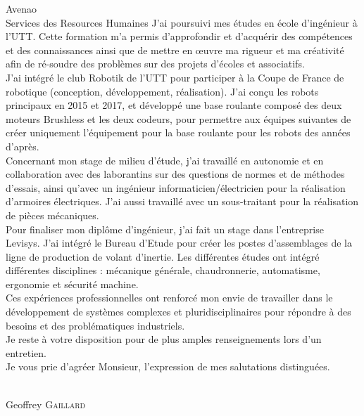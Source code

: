 \documentclass[a4paper,10pt,firstfoot=false]{scrlttr2}
\begin{document}
\begin{letter}{Avenao \\ Services des Resources Humaines}
J’ai poursuivi mes études en école d’ingénieur à l’UTT. Cette formation m’a permis d’approfondir et d’acquérir des compétences et des connaissances ainsi que de mettre en œuvre ma rigueur et ma créativité afin de ré-soudre des problèmes sur des projets d’écoles et associatifs.\\

J'ai intégré le club Robotik de l'UTT pour participer à la Coupe de France de robotique (conception, développement, réalisation). J'ai conçu les robots principaux en 2015 et 2017, et développé une base roulante composé des deux moteurs Brushless et les deux codeurs, pour permettre aux équipes suivantes de créer uniquement l'équipement pour la base roulante pour les robots des années d'après.\\

Concernant mon stage de milieu d’étude, j’ai travaillé en autonomie et en collaboration avec des laborantins sur des questions de normes et de méthodes d’essais, ainsi qu’avec un ingénieur informaticien/électricien pour la réalisation d’armoires électriques. J’ai aussi travaillé avec un sous-traitant pour la réalisation de pièces mécaniques.\\

Pour finaliser mon diplôme d'ingénieur, j'ai fait un stage dans l'entreprise Levisys. J'ai intégré le Bureau d'Etude pour créer les postes d'assemblages de la ligne de production de volant d'inertie. Les différentes études ont intégré différentes disciplines : mécanique générale, chaudronnerie, automatisme, ergonomie et sécurité machine.\\

Ces expériences professionnelles ont renforcé mon envie de travailler dans le développement de systèmes complexes et pluridisciplinaires pour répondre à des besoins et des problématiques industriels.\\

Je reste à votre disposition pour de plus amples renseignements lors d’un entretien.\\
Je vous prie d’agréer Monsieur, l’expression de mes salutations distinguées.

\begin{flushright}
\\[6ex] Geoffrey \textsc{Gaillard}
\end{flushright}

\end{letter}
\end{document}
